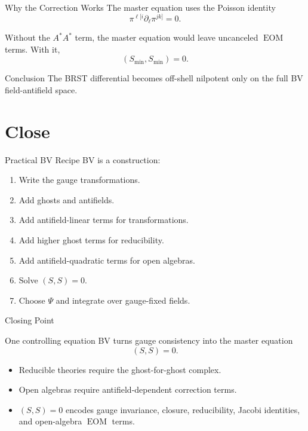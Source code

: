 \documentclass[aspectratio=169,professionalfonts]{beamer}
\newcommand{\EOM}{\ensuremath{\operatorname{EOM}}}
\begin{document}
\begin{frame}{Why the Correction Works}
  The master equation uses the Poisson identity
  \[
    \pi^{\ell[i}\partial_\ell\pi^{jk]}=0 .
  \]

  Without the $A^*A^*$ term, the master equation would leave uncanceled
  \EOM{} terms. With it,
  \[
    (S_{\min},S_{\min})=0 .
  \]

  \begin{exampleblock}{Conclusion}
    The BRST differential becomes off-shell nilpotent only on the full BV
    field-antifield space.
  \end{exampleblock}
\end{frame}

\section{Close}

\begin{frame}{Practical BV Recipe}
  BV is a construction:
  \begin{enumerate}
    \item Write the gauge transformations.
    \item Add ghosts and antifields.
    \item Add antifield-linear terms for transformations.
    \item Add higher ghost terms for reducibility.
    \item Add antifield-quadratic terms for open algebras.
    \item Solve $(S,S)=0$.
    \item Choose $\Psi$ and integrate over gauge-fixed fields.
  \end{enumerate}
\end{frame}

\begin{frame}{Closing Point}
  \begin{alertblock}{One controlling equation}
    BV turns gauge consistency into the master equation
    \[
      (S,S)=0 .
    \]
  \end{alertblock}

  \begin{itemize}
    \item Reducible theories require the ghost-for-ghost complex.
    \item Open algebras require antifield-dependent correction terms.
    \item $(S,S)=0$ encodes gauge invariance, closure, reducibility, Jacobi
      identities, and open-algebra \EOM{} terms.
  \end{itemize}
\end{frame}
\end{document}
